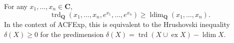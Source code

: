 For any $x_1, \ldots, x_n \in \mathbf{C}$,
$$\operatorname{trd}_{\mathbf{Q}}(x_1, \ldots, x_n, e^{x_1}, \ldots, e^{x_n}) \geq \operatorname{ldim}_{\mathbf{Q}}(x_1, \ldots, x_n).$$
In the context of ACFExp, this is equivalent to the Hrushovski inequality $\delta(X) \geq 0$ for the predimension $\delta(X) = \operatorname{trd}(X \cup \operatorname{ex} X) - \operatorname{ldim} X$.
